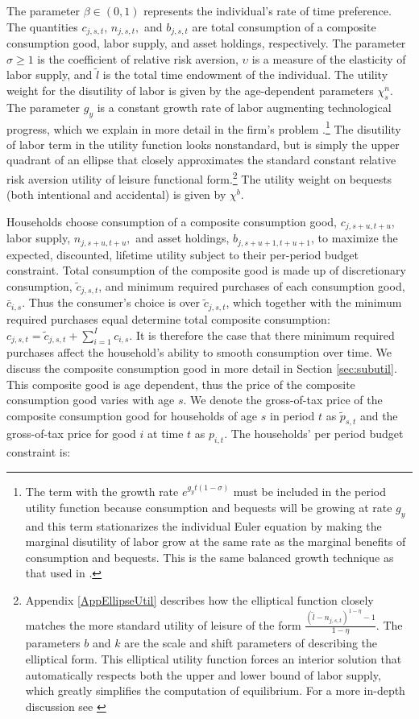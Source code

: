 \noindent\noindent The parameter $\beta\in(0,1)$ represents the individual's rate of time preference.  The quantities $c_{j,s,t}$, $n_{j,s,t},$ and $b_{j,s,t}$ are total consumption of a composite consumption good, labor supply, and asset holdings, respectively.  The parameter $\sigma \geq 1$ is the coefficient of relative risk aversion, $\upsilon$ is a measure of the elasticity of labor supply, and $\tilde{l}$ is the total time endowment of the individual.  The utility weight for the disutility of labor is given by the age-dependent parameters $\chi^{n}_{s}$.  The parameter $g_y$ is a constant growth rate of labor augmenting technological progress, which we explain in more detail in the firm's problem .\footnote{The term with the growth rate $e^{g_y t(1-\sigma)}$ must be included in the period utility function because consumption and bequests will be growing at rate $g_y$ and this term stationarizes the individual Euler equation by making the marginal disutility of labor grow at the same rate as the marginal benefits of consumption and bequests.  This is the same balanced growth technique as that used in \citet{MertensRavn:2011}.}  The disutility of labor term in the utility function looks nonstandard, but is simply the upper quadrant of an ellipse that closely approximates the standard constant relative risk aversion utility of leisure functional form.\footnote{Appendix \ref{AppEllipseUtil} describes how the elliptical function closely matches the more standard utility of leisure of the form $\frac{(\tilde{l}-n_{j,s,t})^{1-\eta} - 1}{1-\eta}$. The parameters $b$ and $k$ are the scale and shift parameters of describing the elliptical form.  This elliptical utility function forces an interior solution that automatically respects both the upper and lower bound of labor supply, which greatly simplifies the computation of equilibrium.  For a more in-depth discussion see \citet{EvanPhillips:2015}} The utility weight on bequests (both intentional and accidental) is given by $\chi^{b}$.


    Households choose consumption of a composite consumption good, $c_{j,s+u,t+u}$, labor supply, $n_{j,s+u,t+u},$ and asset holdings, $b_{j,s+u+1,t+u+1}$, to maximize the expected, discounted, lifetime utility subject to their per-period budget constraint.  Total consumption of the composite good is made up of discretionary consumption, $\tilde{c}_{j,s,t}$, and minimum required purchases of each consumption good, $\bar{c}_{i,s}$.  Thus the consumer's choice is over $\tilde{c}_{j,s,t}$, which together with the minimum required purchases equal determine total composite consumption: $c_{j,s,t}=\tilde{c}_{j,s,t}+\sum_{i=1}^{I}c_{i,s}$.  It is therefore the case that there minimum required purchases affect the household's ability to smooth consumption over time.  We discuss the composite consumption good in more detail in Section \ref{sec:subutil}.  This composite good is age dependent, thus the price of the composite consumption good varies with age $s$.  We denote the gross-of-tax price of the composite consumption good for households of age $s$ in period $t$ as $\tilde{p}_{s,t}$ and the gross-of-tax price for good $i$ at time $t$ as $p_{i,t}$. The households' per period budget constraint is:
    
